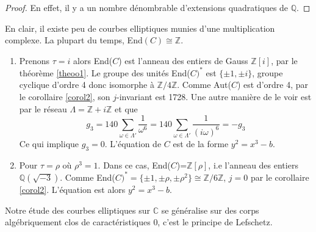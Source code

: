 \documentclass[a4paper]{article}
\begin{document}
\begin{proof}
En effet, il y a un nombre dénombrable d'extensions quadratiques de $\mathbb{Q}$.
\end{proof}
\noindent En clair, il existe peu de courbes elliptiques munies d'une multiplication complexe. La plupart du temps, End$(C) \cong \mathbb{Z}$.
\begin{ex}
\begin{enumerate}
\item
\normalfont Prenons $\tau=i$ alors End($C$) est l'anneau des entiers de Gauss $\mathbb{Z}[i]$, par le théorème \ref{theoo1}.
Le groupe des unités End($C)^*$ est $\{\pm 1,\pm i\}$, groupe cyclique d'ordre 4 donc isomorphe à $\mathbb{Z}/4\mathbb{Z}$. Comme Aut($C$) est d'ordre 4, par le corollaire \ref{corol2}, son $j$-invariant est 1728. Une autre manière de le voir est par le réseau $\Lambda=\mathbb{Z}+i\mathbb{Z}$ et que
\begin{equation*}
g_{3}=140 \sum \limits_{\omega \in \Lambda'} \frac{1}{\omega^6}=140 \sum \limits_{\omega \in \Lambda'} \frac{1}{(i\omega)^6}=-g_{3}
\end{equation*}
Ce qui implique $g_{3}=0$.
L'équation de $C$ est de la forme $y^2=x^3-b$.
\item Pour $\tau=\rho$ où $\rho^3=1$. Dans ce cas, End($C$)=$\mathbb{Z}[\rho]$, i.e l'anneau des entiers $\mathbb{Q}(\sqrt{-3})$. Comme End($C)^*=\{\pm 1,\pm \rho,\pm \rho^2 \} \cong \mathbb{Z}/6\mathbb{Z}$, $j=0$ par le corollaire \ref{corol2}. L'équation est alors $y^2=x^3-b$.
\end{enumerate}
\end{ex}













\begin{rem}
\normalfont Notre étude des courbes elliptiques sur $\mathbb{C}$ se généralise sur des corps algébriquement clos de caractéristiques 0, c'est le principe de Lefschetz. 
\end{rem}










\newpage

\newpage

\appendix
\end{document}
